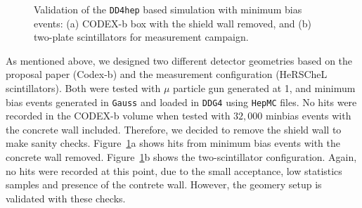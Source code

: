 \begin{figure}
\centering
{}
\caption{\label{fig:dd4hep_events}
    Validation of the {\tt DD4hep} based simulation with minimum bias events: (a) CODEX-b box with the shield wall removed, and (b) two-plate scintillators for measurement campaign.}
\end{figure}

As mentioned above, we designed two different detector geometries based on the proposal paper (Codex-b) and the measurement configuration (HeRSCheL scintillators). Both were tested with $\mu$ particle gun generated at 1\tev, and minimum bias events generated in {\tt Gauss} and loaded in {\tt DDG4} using {\tt HepMC} files. 
No hits were recorded in the CODEX-b volume when tested with $32,000$ minbias events with the concrete wall included. Therefore, we decided to remove the shield wall to make sanity checks. Figure~\ref{fig:dd4hep_events}a shows hits from minimum bias events with the concrete wall removed. Figure~\ref{fig:dd4hep_events}b shows the two-scintillator configuration. Again, no hits were recorded at this point, due to the small acceptance, low statistics samples and presence of the contrete wall. However, the geomery setup is validated with these checks.

